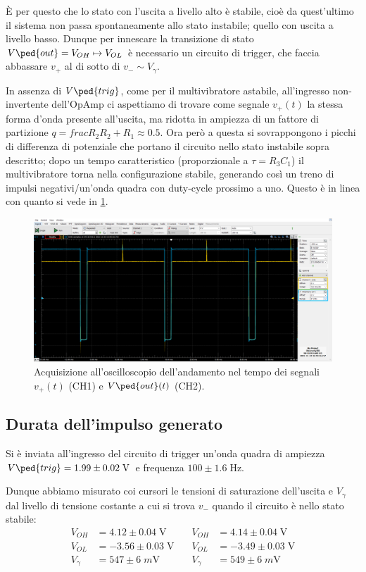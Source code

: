 \documentclass[10pt, a4paper, italian]{article}
\begin{document}
\`E per questo che lo stato con l'uscita a livello alto è stabile,
cioè da quest'ultimo il sistema non passa spontaneamente allo stato instabile;
quello con uscita a livello basso.
Dunque per innescare la transizione di stato
$V\ped{out} = V_{OH} \mapsto V_{OL}$ è necessario un circuito di trigger,
che faccia abbassare $v_+$ al di sotto di $v_- \sim V_\gamma$.

In assenza di $V\ped{trig}$, come per il multivibratore astabile, all'ingresso
non-invertente dell'OpAmp ci aspettiamo di trovare come segnale $v_+ (t)$ la
stessa forma d'onda presente all'uscita, ma ridotta in ampiezza di un fattore di partizione $q = frac{R_2}{R_2 + R_1} \approx 0.5$.
Ora però a questa si sovrappongono i picchi di differenza di potenziale che
portano il circuito nello stato instabile sopra descritto; dopo un tempo
caratteristico (proporzionale a $\tau = R_3 C_1$) il multivibratore torna
nella configurazione stabile, generando così un treno di impulsi
negativi/un'onda quadra con duty-cycle prossimo a uno.
Questo è in linea con quanto si vede in \cref{fig: mstabilev+}.
\begin{figure}[htbp]
\centering
\includegraphics[scale=0.42]{monostabileV+}
\caption{Acquisizione all'oscilloscopio dell'andamento nel tempo dei
segnali $v_+ (t)$ (CH1) e $V\ped{out} (t)$ (CH2). \label{fig: mstabilev+}}
\end{figure}

\subsection{Durata dell'impulso generato}
Si è inviata all'ingresso del circuito di trigger un'onda quadra di ampiezza
$V\ped{trig} = 1.99 \pm 0.02 \; \si{\V}$ e frequenza $100 \pm 1.6 \; \si{\Hz}$.

Dunque abbiamo misurato coi cursori le tensioni di saturazione dell'uscita e 
$V_\gamma$ dal livello di tensione costante a cui si trova $v_-$ quando il
circuito è nello stato stabile:
\begin{align*}
V_{OH} &= 4.12 \pm 0.04 \; \si{\V} \quad &V_{OH} &= 4.14 \pm 0.04 \; \si{\V} \\
V_{OL} &= -3.56 \pm 0.03 \; \si{\V} \quad &V_{OL} &= -3.49 \pm 0.03 \; \si{\V} \\
V_{\gamma} &= 547 \pm 6 \; \si{m\V} \quad &V_{\gamma} &= 549 \pm 6 \; \si{m\V}
\end{align*}
\end{document}
